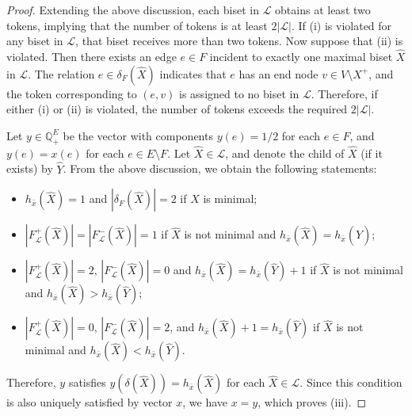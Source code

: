 \documentclass{article}
\newcommand{\Lfam}{\mathcal{L}}
\newcommand{\Rset}{\mathbb{Q}}
\begin{document}
\begin{proof}
Extending the above discussion, each biset in $\Lfam$ obtains at least two tokens, implying that the number of tokens is at least $2|\Lfam|$. If (i) is violated
for any biset in $\Lfam$,
that biset receives more than two tokens. Now suppose that (ii) is violated. Then 
there exists an edge $e \in F$ incident to exactly one maximal biset $\hat{X}$ in $\Lfam$. 
The relation $e \in \delta_F(\hat{X})$ indicates that $e$ has an end node $v \in V \setminus X^+$,
and the token corresponding to $(e,v)$ is assigned to no biset in $\Lfam$.
Therefore, if either (i) or (ii) is violated, the number of tokens exceeds the required $2|\Lfam|$.

Let $y \in \Rset_+^E$ be the vector with components $y(e)=1/2$ for each $e \in F$, and $y(e)=x(e)$
for each $e \in E\setminus F$.
Let $\hat{X} \in \Lfam$, and denote the child of $\hat{X}$ (if it exists) by $\hat{Y}$.
From the above discussion, we obtain the following statements:
\begin{itemize}
\item $h_{\bar{x}}(\hat{X})=1$ and $|\delta_F(\hat{X})|=2$ if $\hat{X}$ is minimal;
\item $|F^+_{\Lfam}(\hat{X})|=|F^-_{\Lfam}(\hat{X})|=1$ if
$\hat{X}$ is not minimal and $h_{\bar{x}}(\hat{X})=h_{\bar{x}}(\hat{Y})$;
\item 
$|F^+_{\Lfam}(\hat{X})|=2$, $|F^-_{\Lfam}(\hat{X})|=0$ 
and $h_{\bar{x}}(\hat{X})=h_{\bar{x}}(\hat{Y})+1$
if
$\hat{X}$ is not minimal and $h_{\bar{x}}(\hat{X})>h_{\bar{x}}(\hat{Y})$;
\item 
$|F^+_{\Lfam}(\hat{X})|=0$, $|F^-_{\Lfam}(\hat{X})|=2$, 
and $h_{\bar{x}}(\hat{X})+1=h_{\bar{x}}(\hat{Y})$
if
$\hat{X}$ is not minimal and $h_{\bar{x}}(\hat{X}) < h_{\bar{x}}(\hat{Y})$.
\end{itemize}
Therefore, $y$ satisfies $y(\delta(\hat{X}))=h_{\bar{x}}(\hat{X})$ 
for each $\hat{X} \in \Lfam$. 
Since this condition is also uniquely satisfied by vector $x$,
we have $x=y$, which proves (iii).
\end{proof}
\end{document}

